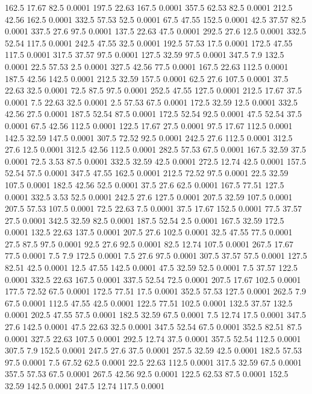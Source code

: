 162.5	17.67	82.5	0.0001
197.5	22.63	167.5	0.0001
357.5	62.53	82.5	0.0001
212.5	42.56	162.5	0.0001
332.5	57.53	52.5	0.0001
67.5	47.55	152.5	0.0001
42.5	37.57	82.5	0.0001
337.5	27.6	97.5	0.0001
137.5	22.63	47.5	0.0001
292.5	27.6	12.5	0.0001
332.5	52.54	117.5	0.0001
242.5	47.55	32.5	0.0001
192.5	57.53	17.5	0.0001
172.5	47.55	117.5	0.0001
317.5	37.57	97.5	0.0001
127.5	32.59	97.5	0.0001
347.5	7.9	132.5	0.0001
22.5	57.53	2.5	0.0001
327.5	42.56	77.5	0.0001
167.5	22.63	112.5	0.0001
187.5	42.56	142.5	0.0001
212.5	32.59	157.5	0.0001
62.5	27.6	107.5	0.0001
37.5	22.63	32.5	0.0001
72.5	87.5	97.5	0.0001
252.5	47.55	127.5	0.0001
212.5	17.67	37.5	0.0001
7.5	22.63	32.5	0.0001
2.5	57.53	67.5	0.0001
172.5	32.59	12.5	0.0001
332.5	42.56	27.5	0.0001
187.5	52.54	87.5	0.0001
172.5	52.54	92.5	0.0001
47.5	52.54	37.5	0.0001
67.5	42.56	112.5	0.0001
122.5	17.67	27.5	0.0001
97.5	17.67	112.5	0.0001
142.5	32.59	147.5	0.0001
307.5	72.52	92.5	0.0001
242.5	27.6	112.5	0.0001
312.5	27.6	12.5	0.0001
312.5	42.56	112.5	0.0001
282.5	57.53	67.5	0.0001
167.5	32.59	37.5	0.0001
72.5	3.53	87.5	0.0001
332.5	32.59	42.5	0.0001
272.5	12.74	42.5	0.0001
157.5	52.54	57.5	0.0001
347.5	47.55	162.5	0.0001
212.5	72.52	97.5	0.0001
22.5	32.59	107.5	0.0001
182.5	42.56	52.5	0.0001
37.5	27.6	62.5	0.0001
167.5	77.51	127.5	0.0001
332.5	3.53	52.5	0.0001
242.5	27.6	127.5	0.0001
207.5	32.59	107.5	0.0001
207.5	57.53	107.5	0.0001
72.5	22.63	7.5	0.0001
37.5	17.67	152.5	0.0001
77.5	37.57	27.5	0.0001
342.5	32.59	82.5	0.0001
187.5	52.54	2.5	0.0001
167.5	32.59	172.5	0.0001
132.5	22.63	137.5	0.0001
207.5	27.6	102.5	0.0001
32.5	47.55	77.5	0.0001
27.5	87.5	97.5	0.0001
92.5	27.6	92.5	0.0001
82.5	12.74	107.5	0.0001
267.5	17.67	77.5	0.0001
7.5	7.9	172.5	0.0001
7.5	27.6	97.5	0.0001
307.5	37.57	57.5	0.0001
127.5	82.51	42.5	0.0001
12.5	47.55	142.5	0.0001
47.5	32.59	52.5	0.0001
7.5	37.57	122.5	0.0001
332.5	22.63	167.5	0.0001
337.5	52.54	72.5	0.0001
207.5	17.67	102.5	0.0001
177.5	72.52	67.5	0.0001
172.5	77.51	17.5	0.0001
352.5	57.53	127.5	0.0001
262.5	7.9	67.5	0.0001
112.5	47.55	42.5	0.0001
122.5	77.51	102.5	0.0001
132.5	37.57	132.5	0.0001
202.5	47.55	57.5	0.0001
182.5	32.59	67.5	0.0001
7.5	12.74	17.5	0.0001
347.5	27.6	142.5	0.0001
47.5	22.63	32.5	0.0001
347.5	52.54	67.5	0.0001
352.5	82.51	87.5	0.0001
327.5	22.63	107.5	0.0001
292.5	12.74	37.5	0.0001
357.5	52.54	112.5	0.0001
307.5	7.9	152.5	0.0001
247.5	27.6	37.5	0.0001
257.5	32.59	42.5	0.0001
182.5	57.53	97.5	0.0001
7.5	67.52	62.5	0.0001
22.5	22.63	112.5	0.0001
317.5	32.59	67.5	0.0001
357.5	57.53	67.5	0.0001
267.5	42.56	92.5	0.0001
122.5	62.53	87.5	0.0001
152.5	32.59	142.5	0.0001
247.5	12.74	117.5	0.0001
